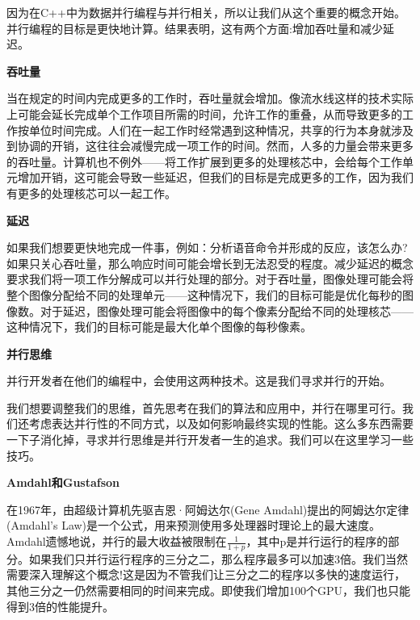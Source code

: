 
因为在C++中为数据并行编程与并行相关，所以让我们从这个重要的概念开始。并行编程的目标是更快地计算。结果表明，这有两个方面:增加吞吐量和减少延迟。\par

\hspace*{\fill} \par %
\textbf{吞吐量}

当在规定的时间内完成更多的工作时，吞吐量就会增加。像流水线这样的技术实际上可能会延长完成单个工作项目所需的时间，允许工作的重叠，从而导致更多的工作按单位时间完成。人们在一起工作时经常遇到这种情况，共享的行为本身就涉及到协调的开销，这往往会减慢完成一项工作的时间。然而，人多的力量会带来更多的吞吐量。计算机也不例外——将工作扩展到更多的处理核芯中，会给每个工作单元增加开销，这可能会导致一些延迟，但我们的目标是完成更多的工作，因为我们有更多的处理核芯可以一起工作。\par

\hspace*{\fill} \par %
\textbf{延迟}

如果我们想要更快地完成一件事，例如：分析语音命令并形成的反应，该怎么办?如果只关心吞吐量，那么响应时间可能会增长到无法忍受的程度。减少延迟的概念要求我们将一项工作分解成可以并行处理的部分。对于吞吐量，图像处理可能会将整个图像分配给不同的处理单元——这种情况下，我们的目标可能是优化每秒的图像数。对于延迟，图像处理可能会将图像中的每个像素分配给不同的处理核芯——这种情况下，我们的目标可能是最大化单个图像的每秒像素。\par

\hspace*{\fill} \par %
\textbf{并行思维}

并行开发者在他们的编程中，会使用这两种技术。这是我们寻求并行的开始。\par

我们想要调整我们的思维，首先思考在我们的算法和应用中，并行在哪里可行。我们还考虑表达并行性的不同方式，以及如何影响最终实现的性能。这么多东西需要一下子消化掉，寻求并行思维是并行开发者一生的追求。我们可以在这里学习一些技巧。\par

\hspace*{\fill} \par %
\textbf{Amdahl和Gustafson}

在1967年，由超级计算机先驱吉恩·阿姆达尔(Gene Amdahl)提出的阿姆达尔定律(Amdahl’s Law)是一个公式，用来预测使用多处理器时理论上的最大速度。Amdahl遗憾地说，并行的最大收益被限制在$\frac{1}{1+p}$，其中p是并行运行的程序的部分。如果我们只并行运行程序的三分之二，那么程序最多可以加速3倍。我们当然需要深入理解这个概念!这是因为不管我们让三分之二的程序以多快的速度运行，其他三分之一仍然需要相同的时间来完成。即使我们增加100个GPU，我们也只能得到3倍的性能提升。\par

